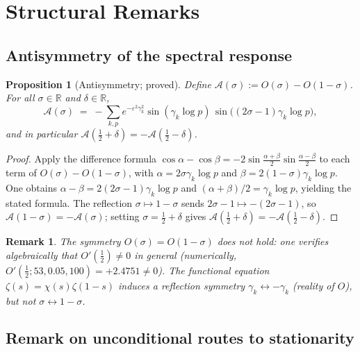 \documentclass[11pt]{article}
\newtheorem{proposition}[theorem]{Proposition}
\newtheorem*{remark}{Remark}
\begin{document}
\section{Structural Remarks}
\label{sec:struct}

\subsection{Antisymmetry of the spectral response}

\begin{proposition}[Antisymmetry; proved]
\label{prop:antisym}
Define $\mathcal{A}(\sigma):=O(\sigma)-O(1-\sigma)$.
For all $\sigma\in\mathbb{R}$ and $\delta\in\mathbb{R}$,
\[
\mathcal{A}(\sigma)
  \;=\; -\sum_{k,p}e^{-\varepsilon^2\gamma_k^2}
    \sin(\gamma_k\log p)\,\sin\bigl((2\sigma-1)\gamma_k\log p\bigr),
\]
and in particular $\mathcal{A}(\tfrac12+\delta)=-\mathcal{A}(\tfrac12-\delta)$.
\end{proposition}

\begin{proof}
Apply the difference formula $\cos\alpha-\cos\beta
=-2\sin\tfrac{\alpha+\beta}{2}\sin\tfrac{\alpha-\beta}{2}$
to each term of $O(\sigma)-O(1-\sigma)$, with
$\alpha=2\sigma\gamma_k\log p$ and $\beta=2(1-\sigma)\gamma_k\log p$.
One obtains $\alpha-\beta=2(2\sigma-1)\gamma_k\log p$ and
$(\alpha+\beta)/2=\gamma_k\log p$, yielding the stated formula.
The reflection $\sigma\mapsto 1-\sigma$ sends $2\sigma-1\mapsto-(2\sigma-1)$,
so $\mathcal{A}(1-\sigma)=-\mathcal{A}(\sigma)$; setting $\sigma=\tfrac12+\delta$
gives $\mathcal{A}(\tfrac12+\delta)=-\mathcal{A}(\tfrac12-\delta)$.
\end{proof}

\begin{remark}
The symmetry $O(\sigma)=O(1-\sigma)$ does not hold:
one verifies algebraically that $O'(\tfrac12)\ne 0$ in general
(numerically, $O'(\tfrac12;53,0.05,100)=+2.4751\ne 0$).
The functional equation $\zeta(s)=\chi(s)\zeta(1-s)$ induces a
reflection symmetry $\gamma_k\leftrightarrow-\gamma_k$ (reality of
$O$), but not $\sigma\leftrightarrow 1-\sigma$.
\end{remark}

\subsection{Remark on unconditional routes to stationarity}
\end{document}
